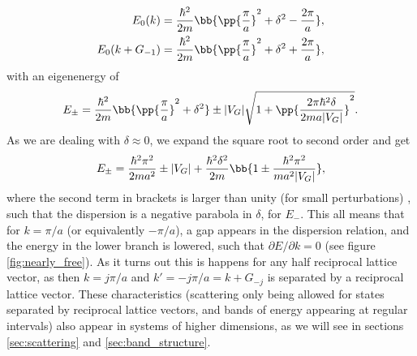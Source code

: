 \documentclass[main.tex]{subfiles}
\begin{document}
	\begin{align}
		E_0(k) &= \frac{\hbar^2}{2m}\bb{\pp{\frac{\pi}{a}}^2 + \delta^2 - \frac{2\pi}{a}}, \\
		E_0(k+G_{-1}) &= \frac{\hbar^2}{2m} \bb{\pp{\frac{\pi}{a}}^2 + \delta^2 + \frac{2\pi}{a}},
	\end{align}
	with an eigenenergy of \cite{simon}
	\begin{equation}
		E_{\pm} = \frac{\hbar^2}{2m} \bb{\pp{\frac{\pi}{a}}^2 + \delta^2 } \pm |V_G| \sqrt{1+ \pp{\frac{2\pi\hbar^2 \delta}{2m a |V_G|}}^2 }.
	\end{equation}
	As we are dealing with $ \delta \approx 0 $, we expand the square root to second order and get
	\begin{equation}
		E_{\pm} = \frac{\hbar^2 \pi^2}{2m a^2} \pm |V_G| + \frac{\hbar^2 \delta^2}{2m} \bb{1 \pm \frac{\hbar^2 \pi^2}{m a^2 |V_G|}},
	\end{equation}
	where the second term in brackets is larger than unity (for small perturbations) \cite{simon}, such that the dispersion is a negative parabola in $ \delta $, for $ E_- $. This all means that for $ k =\pi/a$ (or equivalently $ -\pi/a $), a gap appears in the dispersion relation, and the energy in the lower branch is lowered, such that $ \partial E/ \partial k =0$ (see figure \ref{fig:nearly_free}). As it turns out this is happens for any half reciprocal lattice vector, as then $ k = j \pi/a $ and $ k'=-j \pi /a = k+G_{-j}$ is separated by a reciprocal lattice vector. These characteristics (scattering only being allowed for states separated by reciprocal lattice vectors, and bands of energy appearing at regular intervals) also appear in systems of higher dimensions, as we will see in sections \ref{sec:scattering} and \ref{sec:band_structure}.
	
	
	\newpage
\end{document}
